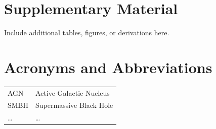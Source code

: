 \begin{appendix}

\chapter{Supplementary Material}

Include additional tables, figures, or derivations here.

\chapter{Acronyms and Abbreviations}

\begin{tabular}{ll}
AGN  & Active Galactic Nucleus \\
SMBH & Supermassive Black Hole \\
\ldots & \ldots \\
\end{tabular}

\end{appendix}
